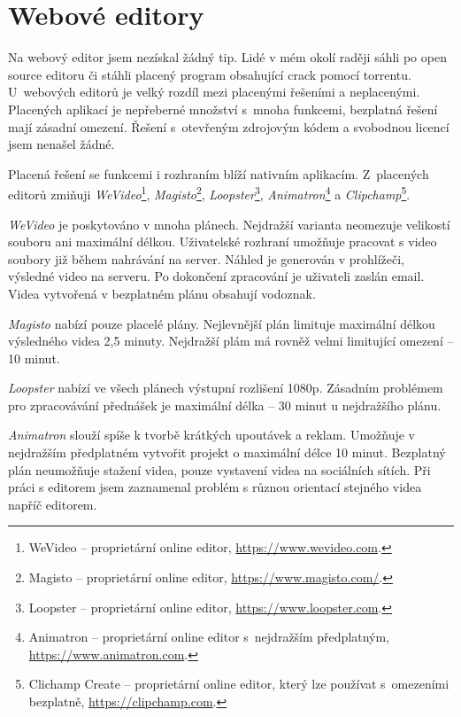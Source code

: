 \section{Webové editory}
Na webový editor jsem nezískal žádný tip. Lidé v mém okolí raději sáhli po open source editoru či stáhli placený program obsahující crack pomocí torrentu. U~webových editorů je velký rozdíl mezi placenými řešeními a neplacenými. Placených aplikací je nepřeberné množství s~mnoha funkcemi, bezplatná řešení mají zásadní omezení. Řešení s~otevřeným zdrojovým kódem a svobodnou licencí jsem nenašel žádné.

Placená řešení se funkcemi i rozhraním blíží nativním aplikacím. Z~placených editorů zmiňuji \textit{WeVideo}\footnote{WeVideo --  proprietární online editor, \url{https://www.wevideo.com}.}, \textit{Magisto}\footnote{Magisto -- proprietární online editor, \url{https://www.magisto.com/}.}, \textit{Loopster}\footnote{Loopster -- proprietární online editor, \url{https://www.loopster.com}.}, \textit{Animatron}\footnote{Animatron -- proprietární online editor s~nejdražším předplatným, \url{https://www.animatron.com}.} a \textit{Clipchamp}\footnote{Clichamp Create -- proprietární online editor, který lze používat s~omezeními bezplatně, \url{https://clipchamp.com}.}.

\textit{WeVideo} je poskytováno v mnoha plánech. Nejdražší varianta neomezuje velikostí souboru ani maximální délkou. Uživatelské rozhraní umožňuje pracovat s video soubory již během nahrávání na server. Náhled je generován v prohlížeči, výsledné video na serveru. Po dokončení zpracování je uživateli zaslán email. Videa vytvořená v bezplatném plánu obsahují vodoznak.

\textit{Magisto} nabízí pouze placelé plány. Nejlevnější plán limituje maximální délkou výsledného videa 2,5 minuty. Nejdražší plám má rovněž velmi limitující omezení -- 10 minut.

\textit{Loopster} nabízí ve všech plánech výstupní rozlišení 1080p. Zásadním problémem pro zpracovávání přednášek je maximální délka -- 30 minut u nejdražšího plánu.

\textit{Animatron} slouží spíše k tvorbě krátkých upoutávek a reklam. Umožňuje v nejdražším předplatném vytvořit projekt o maximální délce 10 minut. Bezplatný plán neumožňuje stažení videa, pouze vystavení videa na sociálních sítích. Při práci s editorem jsem zaznamenal problém s různou orientací stejného videa napříč editorem.

